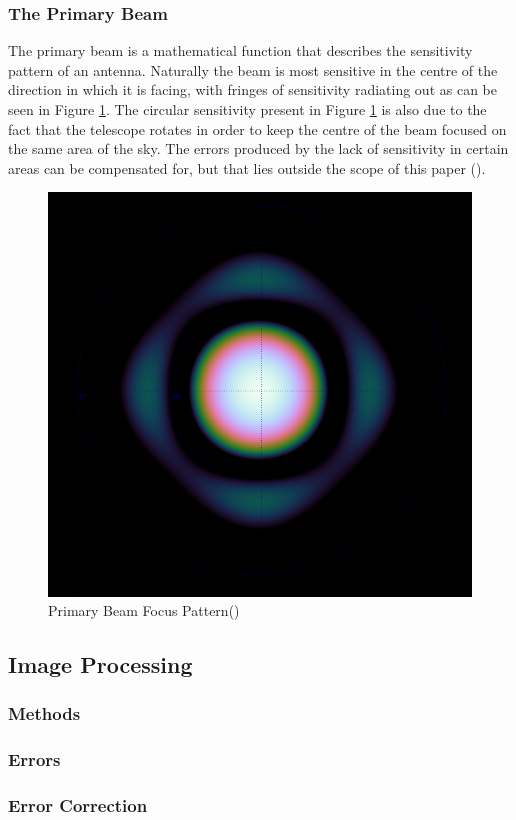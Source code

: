 \subsubsection{The Primary Beam}\label{ra:ssec:tpb}
The primary beam is a mathematical function that describes the sensitivity pattern of an antenna. Naturally the beam is most sensitive in the centre of the direction in which it is facing, with fringes of sensitivity radiating out as can be seen in Figure \ref{ra:fig:beam}. The circular sensitivity present in Figure \ref{ra:fig:beam} is also due to the fact that the telescope rotates in order to keep the centre of the beam focused on the same area of the sky. The errors produced by the lack of sensitivity in certain areas can be compensated for, but that lies outside the scope of this paper (\citet{oleg}).
%
\begin{figure}[H]
	\centering
	\label{ra:fig:beam}
	\includegraphics[scale=0.28]{Images/beam.png}
	\caption{Primary Beam Focus Pattern(\cite{oleg})}
\end{figure}
\subsection{Image Processing}\label{ra:sec:img}
%
\subsubsection{Methods}\label{ra:ssec:meth}
%
\subsubsection{Errors}\label{ra:ssec:err}
%
\subsubsection{Error Correction}\label{ra:ssec:ec}
